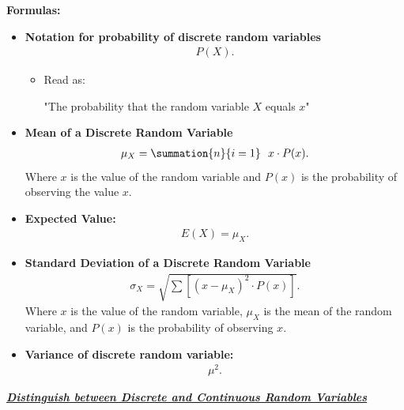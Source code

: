 \documentclass{report}
\begin{document}
    \pagebreak \bigbreak \noindent 
    \textbf{Formulas:}
    \begin{itemize}
        \item \textbf{Notation for probability of discrete random variables}
            \begin{align*}
                P(X)
            .\end{align*}
            \begin{itemize}
                \item Read as:
                    \begin{center}
                        "The probability that the random variable $X $ equals $x $"
                    \end{center}
            \end{itemize}
        \item \textbf{Mean of a Discrete Random Variable}
            \begin{align*}
                \mu_X = \summation{n}{i=1}\ \  x \cdot P(x)
            .\end{align*}
            Where $x $ is the value of the random variable and $P(x)$ is the probability of observing the value $x$.
        \item \textbf{Expected Value:}
            \begin{align*}
                E(X) = \mu_{X}
            .\end{align*}
        \item \textbf{Standard Deviation of a Discrete Random Variable}
            \begin{align*}
                \sigma_X = \sqrt{\sum [(x - \mu_X)^2 \cdot P(x)]}
            .\end{align*}
        Where $x$ is the value of the random variable, $\mu_X$ is the mean of the random variable, and $P(x)$ is the probability of observing $x$.
        \item \textbf{Variance of discrete random variable:}
            \begin{align*}
                \mu^{2}
            .\end{align*}
    \end{itemize}
    \pagebreak \bigbreak \noindent 
    \textbf{\textit{\underline{Distinguish between Discrete and Continuous Random Variables}}}
    \bigbreak \noindent 
\end{document}
